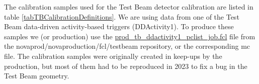 \documentclass[12pt,a4paper]{article}
\begin{document}

The calibration samples used for the Test Beam detector calibration are listed in table \ref{tabTBCalibrationDefinitions}. We are using data from one of the Test Beam data-driven activity-based triggers (DDActivity1). To produce these samples we (or production) use the 
\href{https://github.com/novaexperiment/novaprod/blob/main/novaproduction/fcl/testbeam/prod\_tb\_ddactivity1\_pclist\_job.fcl}{prod\_tb\_ddactivity1\_pclist\_job.fcl} file from the novaprod/novaproduction/fcl/testbeam repository, or the corresponding mc file. The calibration samples were originally created in keep-ups by the production, but most of them had to be reproduced in 2023 to fix a bug in the Test Beam geometry.

\end{document}
